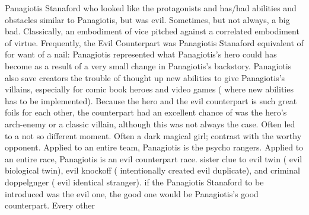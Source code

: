 \documentclass[12pt]{book}
\begin{document}
Panagiotis Stanaford who looked like the protagonists and has/had abilities and obstacles similar to Panagiotis, but was evil. Sometimes, but not always, a big bad. Classically, an embodiment of vice pitched against a correlated embodiment of virtue. Frequently, the Evil Counterpart was Panagiotis Stanaford equivalent of for want of a nail: Panagiotis represented what Panagiotis's hero could has become as a result of a very small change in Panagiotis's backstory. Panagiotis also save creators the trouble of thought up new abilities to give Panagiotis's villains, especially for comic book heroes and video games ( where new abilities has to be implemented). Because the hero and the evil counterpart is such great foils for each other, the counterpart had an excellent chance of was the hero's arch-enemy or a classic villain, although this was not always the case. Often led to a not so different moment. Often a dark magical girl; contrast with the worthy opponent. Applied to an entire team, Panagiotis is the psycho rangers. Applied to an entire race, Panagiotis is an evil counterpart race. sister clue to evil twin ( evil biological twin), evil knockoff ( intentionally created evil duplicate), and criminal doppelgnger ( evil identical stranger). if the Panagiotis Stanaford to be introduced was the evil one, the good one would be Panagiotis's good counterpart. Every other
\end{document}
